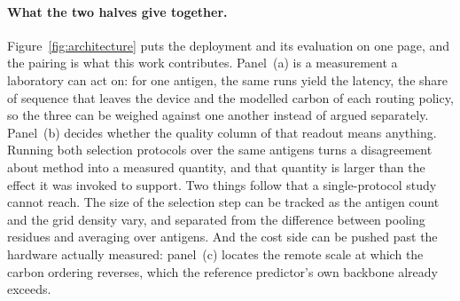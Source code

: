 \paragraph{What the two halves give together.} Figure~\ref{fig:architecture}
puts the deployment and its evaluation on one page, and the pairing is what
this work contributes. Panel~(a) is a measurement a laboratory can act on: for
one antigen, the same runs yield the latency, the share of sequence that leaves
the device and the modelled carbon of each routing policy, so the three can be
weighed against one another instead of argued separately. Panel~(b) decides
whether the quality column of that readout means anything. Running both
selection protocols over the same antigens turns a disagreement about method
into a measured quantity, and that quantity is larger than the effect it was
invoked to support. Two things follow that a single-protocol study cannot
reach. The size of the selection step can be tracked as the antigen count and
the grid density vary, and separated from the difference between pooling
residues and averaging over antigens. And the cost side can be pushed past the
hardware actually measured: panel~(c) locates the remote scale at which the
carbon ordering reverses, which the reference predictor's own backbone already
exceeds.

